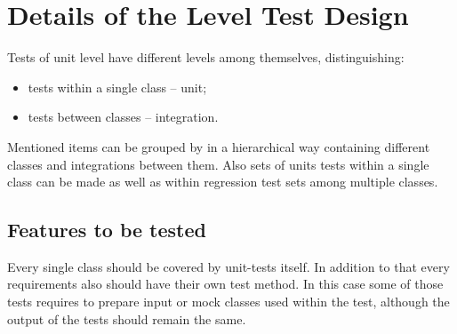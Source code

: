 \chapter{Details of the Level Test Design} \label{chp:details-of-the-level-test-design}
	\begin{comment}
		Introduce the following subordinate sections. This section describes the features to be tested and any
		refinements to the test approach as required for the level. It also identifies the sets of test cases (highest
		level test cases) or scenarios along with the pass/fail criteria. It may also include the test deliverables.
	\end{comment}
	Tests of unit level have different levels among themselves, distinguishing:
	\begin{itemize}
		\item tests within a single class -- unit;
		\item tests between classes -- integration.
	\end{itemize} 
	Mentioned items can be grouped by in a hierarchical way containing different classes and integrations between them. Also sets of units tests within a single class can be made as well as within regression test sets among multiple classes.
\section{Features to be tested} \label{s:details-of-the-level-test-design:features-to-be-tested}
	\begin{comment}
		Identify the test items and describe the features and combinations of features that are the object of this
		LTD. Other features that may be exercised but that are not the specific object of this LTD need not be
		identified (e.g., a database management system that is supporting the reports that are being tested). The
		LTD provides more detailed information than the Level Test Plan. For example, identify an overall test
		architecture of all test scenarios, the individual scenarios, and the detailed test objectives within each
		scenario.
		For each feature or feature combination, a reference to its associated requirements in the item
		requirement and/or design description may be included. This may be documented in a Test
		Traceability Matrix (LTP Section 2.2).
	\end{comment}
	Every single class should be covered by unit-tests itself. In addition to that every requirements also should have their own test method. In this case some of those tests requires to prepare input or mock classes used within the test, although the output of the tests should remain the same.
	
